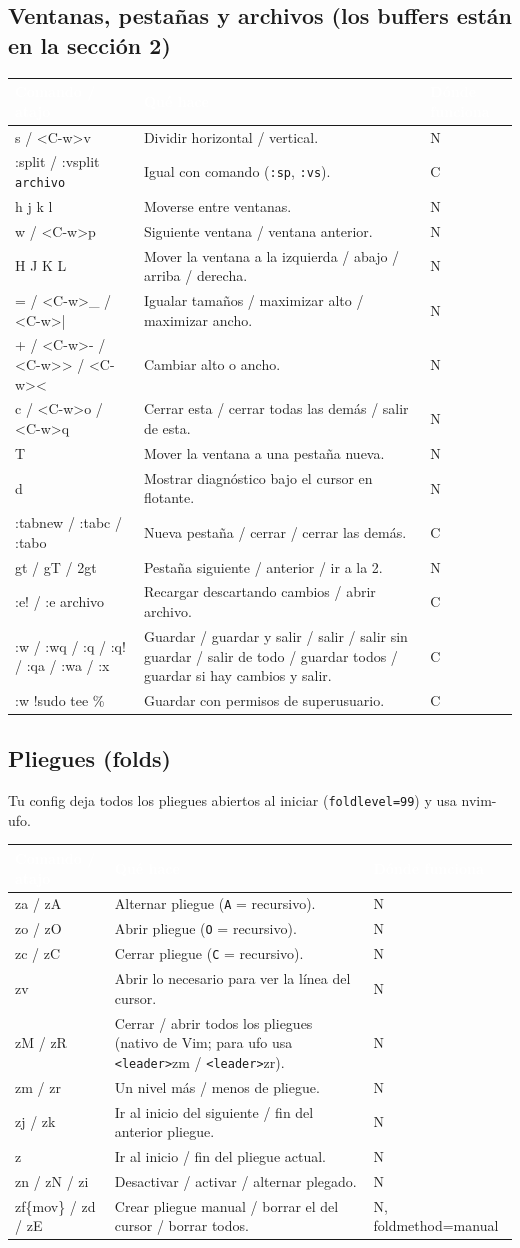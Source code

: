 \documentclass[8pt,a4paper,landscape]{extarticle}
\newcommand{\kk}[1]{\texttt{#1}}
\newcommand{\ld}{\texttt{<leader>}}
\newenvironment{cht}{%
  \begin{longtable}{>{\raggedright\arraybackslash\ttfamily}p{0.27\textwidth}
                    >{\raggedright\arraybackslash}p{0.46\textwidth}
                    >{\raggedright\arraybackslash}p{0.21\textwidth}}
  \rowcolor{accent}\textcolor{white}{\textbf{\rmfamily Comando / atajo}} &
  \textcolor{white}{\textbf{Qué hace}} & \textcolor{white}{\textbf{Dónde funciona}} \\
  \endhead
}{\end{longtable}}
\newcommand{\rr}[3]{#1 & #2 & #3 \\}
\newcommand{\rg}[3]{\rowcolor{rowgray}\relax #1 & #2 & #3 \\}
\let\oldsubsection\subsection
\renewcommand{\subsection}{\Needspace{9\baselineskip}\oldsubsection}
\begin{document}
\subsection{Ventanas, pestañas y archivos (los buffers están en la sección 2)}
\begin{cht}
\rg{<C-w>s / <C-w>v}{Dividir horizontal / vertical.}{N}
\rr{:split / :vsplit \kk{archivo}}{Igual con comando (\kk{:sp}, \kk{:vs}).}{C}
\rg{<C-w>h j k l}{Moverse entre ventanas.}{N}
\rr{<C-w>w / <C-w>p}{Siguiente ventana / ventana anterior.}{N}
\rg{<C-w>H J K L}{Mover la ventana a la izquierda / abajo / arriba / derecha.}{N}
\rr{<C-w>= / <C-w>\_ / <C-w>|}{Igualar tamaños / maximizar alto / maximizar ancho.}{N}
\rg{<C-w>+ / <C-w>- / <C-w>> / <C-w><}{Cambiar alto o ancho.}{N}
\rr{<C-w>c / <C-w>o / <C-w>q}{Cerrar esta / cerrar todas las demás / salir de esta.}{N}
\rg{<C-w>T}{Mover la ventana a una pestaña nueva.}{N}
\rr{<C-w>d}{Mostrar diagnóstico bajo el cursor en flotante.}{N}
\rg{:tabnew / :tabc / :tabo}{Nueva pestaña / cerrar / cerrar las demás.}{C}
\rr{gt / gT / 2gt}{Pestaña siguiente / anterior / ir a la 2.}{N}
\rg{:e! / :e archivo}{Recargar descartando cambios / abrir archivo.}{C}
\rr{:w / :wq / :q / :q! / :qa / :wa / :x}{Guardar / guardar y salir / salir / salir sin guardar / salir de todo / guardar todos / guardar si hay cambios y salir.}{C}
\rg{:w !sudo tee \%}{Guardar con permisos de superusuario.}{C}
\end{cht}

\subsection{Pliegues (folds)}
Tu config deja todos los pliegues abiertos al iniciar (\kk{foldlevel=99}) y usa nvim-ufo.
\begin{cht}
\rg{za / zA}{Alternar pliegue (\kk{A} = recursivo).}{N}
\rr{zo / zO}{Abrir pliegue (\kk{O} = recursivo).}{N}
\rg{zc / zC}{Cerrar pliegue (\kk{C} = recursivo).}{N}
\rr{zv}{Abrir lo necesario para ver la línea del cursor.}{N}
\rg{zM / zR}{Cerrar / abrir todos los pliegues (nativo de Vim; para ufo usa \ld zm / \ld zr).}{N}
\rr{zm / zr}{Un nivel más / menos de pliegue.}{N}
\rg{zj / zk}{Ir al inicio del siguiente / fin del anterior pliegue.}{N}
\rr{[z / ]z}{Ir al inicio / fin del pliegue actual.}{N}
\rg{zn / zN / zi}{Desactivar / activar / alternar plegado.}{N}
\rr{zf\{mov\} / zd / zE}{Crear pliegue manual / borrar el del cursor / borrar todos.}{N, foldmethod=manual}
\end{cht}
\end{document}
